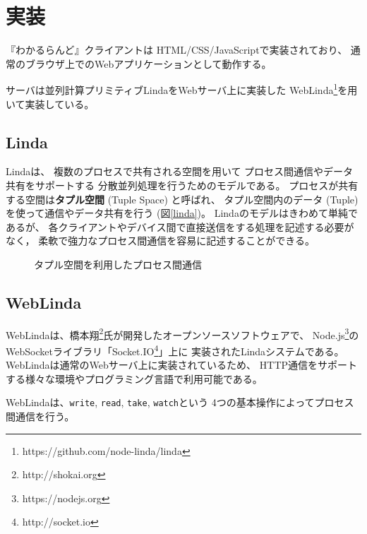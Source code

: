 \section{実装}

『わかるらんど』クライアントは
HTML/CSS/JavaScriptで実装されており、
通常のブラウザ上でのWebアプリケーションとして動作する。

サーバは並列計算プリミティブLindaをWebサーバ上に実装した
WebLinda\footnote{https://github.com/node-linda/linda}を用いて実装している。

\subsection{Linda}

Linda\cite{Carriero:1989:LC:63334.63337}は、
複数のプロセスで共有される空間を用いて
プロセス間通信やデータ共有をサポートする
分散並列処理を行うためのモデルである。
プロセスが共有する空間は\textbf{タプル空間} (Tuple Space) と呼ばれ、
タプル空間内のデータ (Tuple) を使って通信やデータ共有を行う (図\ref{linda})。
Lindaのモデルはきわめて単純であるが、
各クライアントやデバイス間で直接送信をする処理を記述する必要がなく，
柔軟で強力なプロセス間通信を容易に記述することができる。

\begin{figure}[h]
\centering
{}
\caption{タプル空間を利用したプロセス間通信}
\label{button}
\end{figure}

\subsection{WebLinda}
WebLindaは、橋本翔\footnote{http://shokai.org}氏が開発したオープンソースソフトウェアで、
Node.js\footnote{https://nodejs.org}の
WebSocketライブラリ「Socket.IO\footnote{http://socket.io}」上に
実装されたLindaシステムである。
WebLindaは通常のWebサーバ上に実装されているため、
HTTP通信をサポートする様々な環境やプログラミング言語で利用可能である。

WebLindaは、\texttt{write}, \texttt{read}, \texttt{take}, \texttt{watch}という
4つの基本操作によってプロセス間通信を行う。


